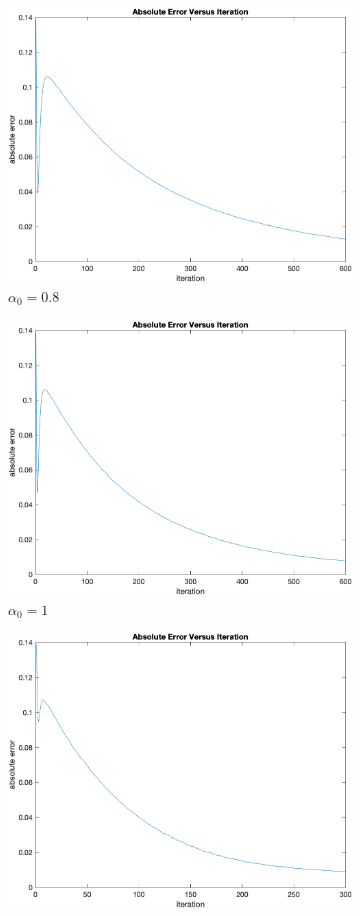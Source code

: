 \documentclass{article}
\begin{document}
\begin{figure}[htp]
\begin{subfigure}{.5\textwidth}
		\includegraphics[width=0.9\linewidth]{figs/Q3/Iteration/M1000_a08.png}
		\caption{$ \alpha_0 = 0.8 $}
	\end{subfigure}
	\begin{subfigure}{.5\textwidth}
		\centering
		\includegraphics[width=0.9\linewidth]{figs/Q3/Iteration/M1000_a1.png}
		\caption{$ \alpha_0 = 1 $}
	\end{subfigure}
	\begin{subfigure}{.5\textwidth}
		\centering
		\includegraphics[width=0.9\linewidth]{figs/Q3/Iteration/M1000_a2.png}

\end{subfigure}
\end{figure}
\end{document}
